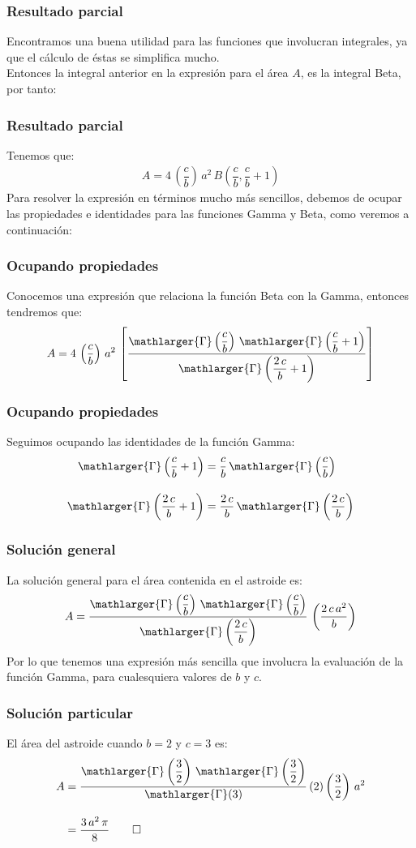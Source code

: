 \documentclass[12pt]{beamer}
\begin{document}
\begin{frame}
\frametitle{Resultado parcial}
Encontramos una buena utilidad para las funciones que involucran integrales, ya que el cálculo de éstas se simplifica mucho.
\\
\bigskip
\pause
Entonces la integral anterior en la expresión para el área $A$, es la integral Beta, por tanto:
\end{frame}
\begin{frame}
\frametitle{Resultado parcial}
Tenemos que:
\pause
\begin{align*}
A = 4 \, \left( \dfrac{c}{b} \right) \, a^{2} \, B \left( \dfrac{c}{b}, \dfrac{c}{b} + 1 \right)
\end{align*}
\pause
Para resolver la expresión en términos mucho más sencillos, debemos de ocupar las propiedades e identidades para las funciones Gamma y Beta, como veremos a continuación:
\end{frame}
\begin{frame}
\frametitle{Ocupando propiedades}
Conocemos una expresión que relaciona la función Beta con la Gamma, entonces tendremos que:
\pause 
\begin{align*}
A = 4 \, \left( \dfrac{c}{b} \right) \, a^{2} \, \left[ \dfrac{\mathlarger{\Gamma} \left( \dfrac{c}{b} \right) \, \mathlarger{\Gamma} \left( \dfrac{c}{b} + 1 \right)}{\mathlarger{\Gamma} \left( \dfrac{2 \, c}{b} + 1 \right)} \right]
\end{align*}
\end{frame}
\begin{frame}
\frametitle{Ocupando propiedades}
Seguimos ocupando las identidades de la función Gamma:
\pause 
\begin{align*}
\mathlarger{\Gamma} \left( \dfrac{c}{b} + 1 \right) &= \dfrac{c}{b} \, \mathlarger{\Gamma} \left( \dfrac{c}{b} \right) \\[1em]
\mathlarger{\Gamma} \left( \dfrac{2 \, c}{b} + 1 \right) &= \dfrac{2 \, c}{b} \, \mathlarger{\Gamma} \left( \dfrac{2 \, c}{b} \right)
\end{align*}
\end{frame}
\begin{frame}
\frametitle{Solución general}
La solución general para el área contenida en el astroide es:
\pause
\begin{align*}
A = \dfrac{\mathlarger{\Gamma} \left( \dfrac{c}{b} \right) \, \mathlarger{\Gamma} \left( \dfrac{c}{b} \right)}{\mathlarger{\Gamma} \left( \dfrac{2 \, c}{b} \right)} \, \left( \dfrac{2 \, c \, a^{2}}{b} \right)
\end{align*}
\pause
Por lo que tenemos una expresión más sencilla que involucra la evaluación de la función Gamma, para cualesquiera valores de $b$ y $c$.
\end{frame}
\begin{frame}
\frametitle{Solución particular}
El área del astroide cuando $b = 2$ y $c = 3$ es:
\pause
\begin{align*}
A &= \dfrac{\mathlarger{\Gamma} \left( \dfrac{3}{2} \right) \, \mathlarger{\Gamma} \left( \dfrac{3}{2} \right)}{\mathlarger{\Gamma} (3)} \, (2) \left( \dfrac{3}{2} \right) \, a^{2} \\[1em]
&= \dfrac{3 \, a^{2} \, \pi}{8} \qed
\end{align*}
\end{frame}
\end{document}
